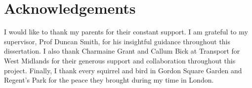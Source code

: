\chapter*{Acknowledgements}

I would like to thank my parents for their constant support. I am grateful to my supervisor, Prof Duncan Smith, for his insightful guidance throughout this dissertation. I also thank Charmaine Grant and Callum Bick at Transport for West Midlands for their generous support and collaboration throughout this project. Finally, I thank every squirrel and bird in Gordon Square Garden and Regent's Park for the peace they brought during my time in London.

\newpage
